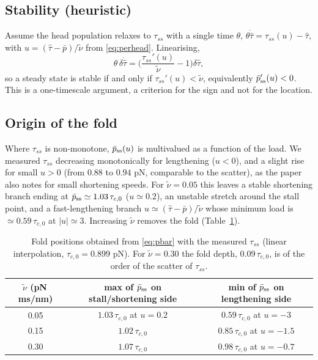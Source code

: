 \documentclass[11pt,a4paper]{article}
\newcommand{\tauz}{\tau_{c,0}}
\newcommand{\pss}{\bar p_{\rm ss}}
\begin{document}
\subsection{Stability (heuristic)}
Assume the head population relaxes to $\tau_{ss}$ with a single time $\theta$, $\theta\dot{\hat\tau}=\tau_{ss}(u)-\hat\tau$, with $u=(\hat\tau-\bar p)/\tilde\nu$ from \eqref{eq:perhead}. Linearising,
\begin{equation}
\theta\,\delta\dot{\hat\tau}=\Big(\frac{\tau_{ss}'(u)}{\tilde\nu}-1\Big)\delta\hat\tau,
\end{equation}
so a steady state is stable if and only if $\tau_{ss}'(u)<\tilde\nu$, equivalently $\pss'(u)<0$. This is a one-timescale argument, a criterion for the sign and not for the location.

\subsection{Origin of the fold}
Where $\tau_{ss}$ is non-monotone, $\pss(u)$ is multivalued as a function of the load. We measured $\tau_{ss}$ decreasing monotonically for lengthening ($u<0$), and a slight rise for small $u>0$ (from $0.88$ to $0.94$ pN, comparable to the scatter), as the paper also notes for small shortening speeds. For $\tilde\nu=0.05$ this leaves a stable shortening branch ending at $\pss\simeq1.03\,\tauz$ ($u\simeq0.2$), an unstable stretch around the stall point, and a fast-lengthening branch $u\simeq(\hat\tau-\bar p)/\tilde\nu$ whose minimum load is $\simeq0.59\,\tauz$ at $|u|\simeq3$. Increasing $\tilde\nu$ removes the fold (Table~\ref{tab:fold}).

\begin{table}[h]
\centering
\begin{tabular}{ccc}
\toprule
$\tilde\nu$ (pN\,ms/nm) & max of $\pss$ on stall/shortening side & min of $\pss$ on lengthening side \\
\midrule
0.05 & $1.03\,\tauz$ at $u=0.2$ & $0.59\,\tauz$ at $u=-3$ \\
0.15 & $1.02\,\tauz$ & $0.85\,\tauz$ at $u=-1.5$ \\
0.30 & $1.07\,\tauz$ & $0.98\,\tauz$ at $u=-0.7$ \\
\bottomrule
\end{tabular}
\caption{Fold positions obtained from \eqref{eq:pbar} with the measured $\tau_{ss}$ (linear interpolation, $\tauz=0.899$ pN). For $\tilde\nu=0.30$ the fold depth, $0.09\,\tauz$, is of the order of the scatter of $\tau_{ss}$.}
\label{tab:fold}
\end{table}
\end{document}
